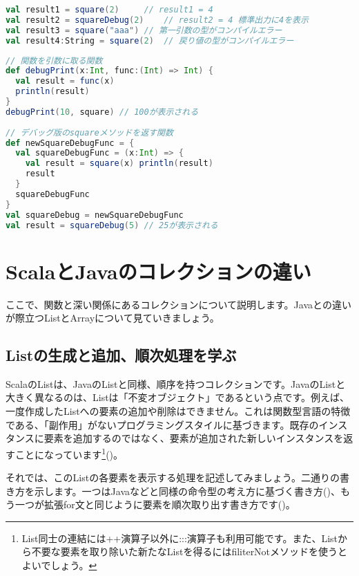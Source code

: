 \begin{lstlisting}[language=scala, label=src:function_call, caption=値としての関数を呼び出す]
val result1 = square(2)		// result1 = 4
val result2 = squareDebug(2)    // result2 = 4 標準出力に4を表示
val result3 = square("aaa")	// 第一引数の型がコンパイルエラー
val result4:String = square(2)	// 戻り値の型がコンパイルエラー 
\end{lstlisting}

\begin{lstlisting}[language=scala, label=src:higher_order_function, caption=関数をメソッドの引数や戻り値に利用する]
// 関数を引数に取る関数
def debugPrint(x:Int, func:(Int) => Int) {
  val result = func(x)
  println(result)
}
debugPrint(10, square) // 100が表示される
 
// デバッグ版のsquareメソッドを返す関数
def newSquareDebugFunc = {
  val squareDebugFunc = (x:Int) => {
    val result = square(x) println(result)
    result
  }
  squareDebugFunc
}
val squareDebug = newSquareDebugFunc
val result = squareDebug(5) // 25が表示される 
\end{lstlisting}

\section{ScalaとJavaのコレクションの違い}
ここで、関数と深い関係にあるコレクションについて説明します。Javaとの違いが際立つListとArrayについて見ていきましょう。

\subsection{Listの生成と追加、順次処理を学ぶ}
ScalaのListは、JavaのListと同様、順序を持つコレクションです。JavaのListと大きく異なるのは、Listは「不変オブジェクト」であるという点です。例えば、一度作成したListへの要素の追加や削除はできません。これは関数型言語の特徴である、「副作用」がないプログラミングスタイルに基づきます。既存のインスタンスに要素を追加するのではなく、要素が追加された新しいインスタンスを返すことになっています\footnote{List同士の連結には++演算子以外に:::演算子も利用可能です。また、Listから不要な要素を取り除いた新たなListを得るにはfiliterNotメソッドを使うとよいでしょう。}()。

それでは、このListの各要素を表示する処理を記述してみましょう。二通りの書き方を示します。一つはJavaなどと同様の命令型の考え方に基づく書き方()、もう一つが拡張for文と同じように要素を順次取り出す書き方です()。


